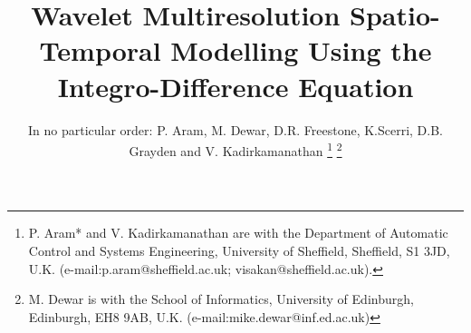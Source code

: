 \documentclass[11pt,draftcls,onecolumn,peerreview]{IEEEtran}
\begin{document}
%
\title{Wavelet Multiresolution Spatio-Temporal Modelling Using the Integro-Difference Equation }
%
%
%

\author{In no particular order: P. Aram, M. Dewar, D.R. Freestone, K.Scerri, D.B. Grayden and V. Kadirkamanathan %
\thanks{P. Aram* and V. Kadirkamanathan are with the Department of Automatic Control and Systems Engineering, University of Sheffield, Sheffield, S1 3JD, U.K. (e-mail:p.aram@sheffield.ac.uk; visakan@sheffield.ac.uk).}%
\thanks{M. Dewar is with the School of Informatics, University of Edinburgh, Edinburgh, EH8 9AB, U.K. (e-mail:mike.dewar@inf.ed.ac.uk)}}%

% 
%



% 
 \ifCLASSOPTIONpeerreview
\else
\fi
\end{document}
